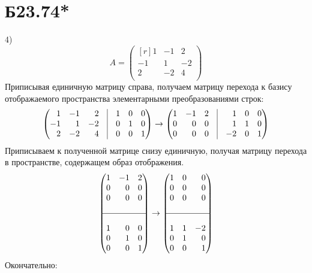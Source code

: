 \documentclass[a4paper,12pt]{article} %
\begin{document}
\section*{Б23.74*}4) $$A=\begin{pmatrix*}[r]
    1&-1&2\\
    -1&1&-2\\
    2&-2&4\\
\end{pmatrix*}$$
Приписывая единичную матрицу справа, получаем матрицу перехода к базису отображаемого пространства элементарными преобразованиями строк:
$$\begin{pmatrix*}[r]
    1&-1&2&\vline&1&0&0\\
    -1&1&-2&\vline&0&1&0\\
    2&-2&4&\vline&0&0&1\\
\end{pmatrix*}\rightarrow\begin{pmatrix*}[r]
    1&-1&2&\vline&1&0&0\\
    0&0&0&\vline&1&1&0\\
    0&0&0&\vline&-2&0&1\\
\end{pmatrix*}$$
Приписываем к полученной матрице снизу единичную, получая матрицу перехода в пространстве, содержащем образ отображения.
$$\begin{pmatrix*}[r]
    1&-1&2\\
    0&0&0\\
    0&0&0\\
    \\
    \hline\\
    1&0&0\\
    0&1&0\\
    0&0&1\\
\end{pmatrix*}\rightarrow\begin{pmatrix*}[r]
    1&0&0\\
    0&0&0\\
    0&0&0\\
    \\
    \hline\\
    1&1&-2\\
    0&1&0\\
    0&0&1\\
\end{pmatrix*}$$
Окончательно:
\end{document}
